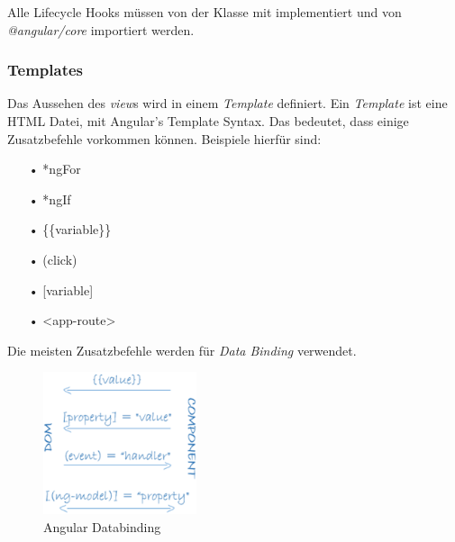 Alle Lifecycle Hooks müssen von der Klasse mit  implementiert und von \textit{@angular/core} importiert werden.

\subsubsection{Templates}
\label{sec:ang-templates}
Das Aussehen des \textit{view}s wird in einem \textit{Template} definiert. Ein \textit{Template} ist eine \ac{HTML} Datei, mit Angular's Template Syntax. Das bedeutet, dass einige Zusatzbefehle vorkommen können. Beispiele hierfür sind:

\begin{itemize}
\item[•]*ngFor
\item[•]*ngIf
\item[•]\{\{variable\}\}
\item[•](click)
\item[•][variable]
\item[•]<app-route>
\end{itemize}

Die meisten Zusatzbefehle werden für \textit{Data Binding} verwendet.
\newpage
\mbox{}
\begin{figure}
\vspace{-50pt}
  \begin{center}
    \includegraphics[width=0.4\textwidth]{Bilder/Greistorfer/databinding}
  \end{center}
  \caption[Angular Databinding]{Angular Databinding\protect\footnotemark}
  \label{Angular Databinding}
  \vspace{0pt}
\end{figure}
\vspace{-40pt}


